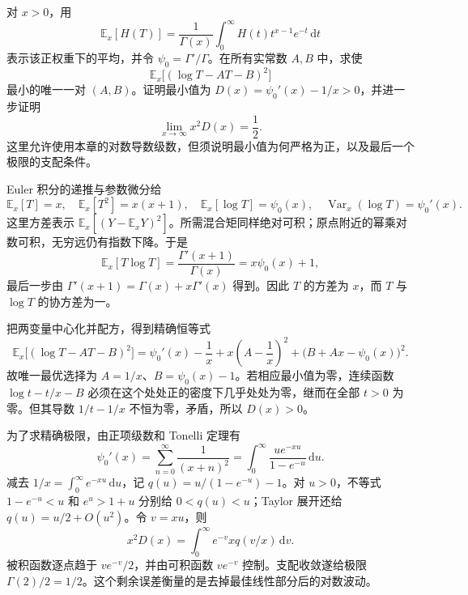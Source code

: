 \BookExercises

\begin{exercise}[对数函数的最优仿射逼近]\label{b3:ex:21-1}
对 \(x>0\)，用
\[
 \mathbb E_x[H(T)]=\frac1{\Gamma(x)}
 \int_0^\infty H(t)t^{x-1}e^{-t}\,\mathrm{d}t
\]
表示该正权重下的平均，并令 \(\psi_0=\Gamma'/\Gamma\)。在所有实常数 \(A,B\) 中，求使
\[
 \mathbb E_x\bigl[(\log T-AT-B)^2\bigr]
\]
最小的唯一一对 \((A,B)\)。证明最小值为
\(D(x)=\psi_0'(x)-1/x>0\)，并进一步证明
\[
 \lim_{x\to\infty}x^2D(x)=\frac12.
\]
这里允许使用本章的对数导数级数，但须说明最小值为何严格为正，以及最后一个极限的支配条件。
\end{exercise}
\begin{solution}
Euler 积分的递推与参数微分给
\[
 \mathbb E_x[T]=x,\quad
 \mathbb E_x[T^2]=x(x+1),\quad
 \mathbb E_x[\log T]=\psi_0(x),\quad
 \operatorname{Var}_x(\log T)=\psi_0'(x).
\]
这里方差表示 \(\mathbb E_x[(Y-\mathbb E_xY)^2]\)。所需混合矩同样绝对可积；原点附近的幂乘对数可积，无穷远仍有指数下降。于是
\[
 \mathbb E_x[T\log T]
 =\frac{\Gamma'(x+1)}{\Gamma(x)}
 =x\psi_0(x)+1,
\]
最后一步由 \(\Gamma'(x+1)=\Gamma(x)+x\Gamma'(x)\) 得到。因此 \(T\) 的方差为 \(x\)，而 \(T\) 与 \(\log T\) 的协方差为一。

把两变量中心化并配方，得到精确恒等式
\[
 \mathbb E_x\bigl[(\log T-AT-B)^2\bigr]
 =\psi_0'(x)-\frac1x
   +x\left(A-\frac1x\right)^2
   +\bigl(B+Ax-\psi_0(x)\bigr)^2.
\]
故唯一最优选择为
\(A=1/x\)、\(B=\psi_0(x)-1\)。若相应最小值为零，连续函数 \(\log t-t/x-B\) 必须在这个处处正的密度下几乎处处为零，继而在全部 \(t>0\) 为零。但其导数 \(1/t-1/x\) 不恒为零，矛盾，所以 \(D(x)>0\)。

为了求精确极限，由正项级数和 Tonelli 定理有
\[
 \psi_0'(x)=\sum_{n=0}^\infty\frac1{(x+n)^2}
 =\int_0^\infty\frac{u e^{-xu}}{1-e^{-u}}\,\mathrm{d}u.
\]
减去 \(1/x=\int_0^\infty e^{-xu}\,\mathrm{d}u\)，记
\(q(u)=u/(1-e^{-u})-1\)。对 \(u>0\)，不等式
\(1-e^{-u}<u\) 和 \(e^u>1+u\) 分别给 \(0<q(u)<u\)；Taylor 展开还给 \(q(u)=u/2+O(u^2)\)。令 \(v=xu\)，则
\[
 x^2D(x)=\int_0^\infty e^{-v}xq(v/x)\,\mathrm{d}v.
\]
被积函数逐点趋于 \(ve^{-v}/2\)，并由可积函数 \(ve^{-v}\) 控制。支配收敛遂给极限 \(\Gamma(2)/2=1/2\)。这个剩余误差衡量的是去掉最佳线性部分后的对数波动。
\end{solution}


